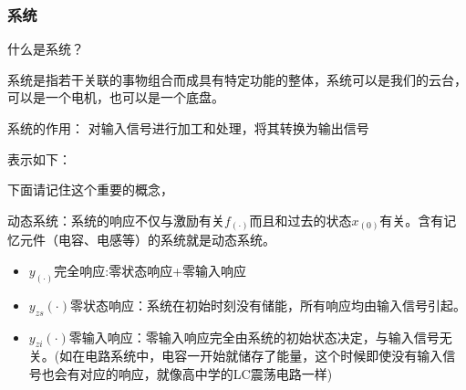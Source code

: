 \documentclass[UTF8,a4paper,12pt]{ctexart}
\begin{document}
    \subsubsection{系统}
    \begin{titlebox}{什么是系统？}
      \begin{flushleft}
        
        \par 系统是指若干关联的事物组合而成具有特定功能的整体，系统可以是我们的云台，可以是一个电机，也可以是一个底盘。
        \par 系统的作用： 对输入信号进行加工和处理，将其转换为输出信号
        \par 表示如下：

        \par 下面请记住这个重要的概念，
        \par 动态系统：系统的响应不仅与激励有关{$f_{(\cdot)}$}而且和过去的状态{$x_{(0)}$}有关。含有记忆元件（电容、电感等）的系统就是动态系统。
        \begin{itemize} 
          \item $y_{(\cdot)}$完全响应:零状态响应+零输入响应
          \item $y_{zs}{(\cdot)}$零状态响应：系统在初始时刻没有储能，所有响应均由输入信号引起。
          \item  $y_{zi}{(\cdot)}$零输入响应：零输入响应完全由系统的初始状态决定，与输入信号无关。(如在电路系统中，电容一开始就储存了能量，这个时候即使没有输入信号也会有对应的响应，就像高中学的LC震荡电路一样)
        \end{itemize}
     
    \end{flushleft}
 
  \end{titlebox}


\begin{flushleft}
  
\end{flushleft}
    
\end{document}
